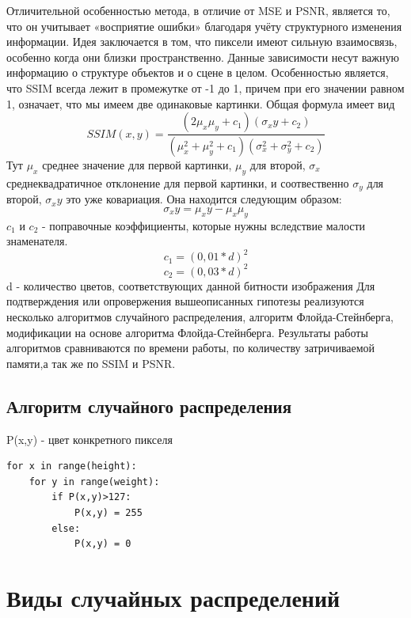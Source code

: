Отличительной особенностью метода, в отличие от MSE и PSNR, является то, что он учитывает «восприятие ошибки» благодаря учёту структурного изменения информации. Идея заключается в том, что пиксели имеют сильную взаимосвязь, особенно когда они близки пространственно. Данные зависимости несут важную информацию о структуре объектов и о сцене в целом.
Особенностью является, что SSIM всегда лежит в промежутке от -1 до 1, причем при его значении равном 1, означает, что мы имеем две одинаковые картинки. Общая формула имеет вид
\begin{equation}
SSIM(x,y) = \frac{(2\mu_x\mu_y +c_1)(\sigma_xy+c_2)}{(\mu^2_x+\mu^2_y+c_1)(\sigma^2_x+\sigma^2_y+c_2)}
\label{F:F3}
\end{equation}
Тут $\mu_x$ среднее значение для первой картинки, $\mu_y$  для второй, $\sigma_x$ среднеквадратичное отклонение для первой картинки, и соотвественно $\sigma_y$ для второй, $\sigma_xy$ это уже ковариация. Она находится следующим образом:
\begin{equation}
\sigma_xy = \mu_xy - \mu_x\mu_y
\label{F:F4}
\end{equation} 
$c_1$ и $c_2$ -  поправочные коэффициенты, которые нужны вследствие малости знаменателя.
\begin{equation}
c_1= (0,01*d)^2 
\label{F:F5} 
\end{equation}
\begin{equation}
c_2=(0,03*d)^2
\label{F:F6}
\end{equation}  
d - количество цветов, соответствующих данной битности изображения 
Для подтверждения или опровержения вышеописанных гипотезы реализуются несколько алгоритмов случайного распределения, алгоритм Флойда-Стейнберга, модификации на основе алгоритма Флойда-Стейнберга. Результаты работы алгоритмов сравниваются по времени работы, по количеству затричиваемой памяти,а так же по SSIM и PSNR.
\subsection{Алгоритм случайного распределения} 
P(x,y)  - цвет конкретного пикселя
\begin{lstlisting}[style=pseudocode,caption={Алгоритм случайного распределения}] 
for x in range(height):
    for y in range(weight):
        if P(x,y)>127:
            P(x,y) = 255
        else:
            P(x,y) = 0
\end{lstlisting}
\section{Виды случайных распределений} 
